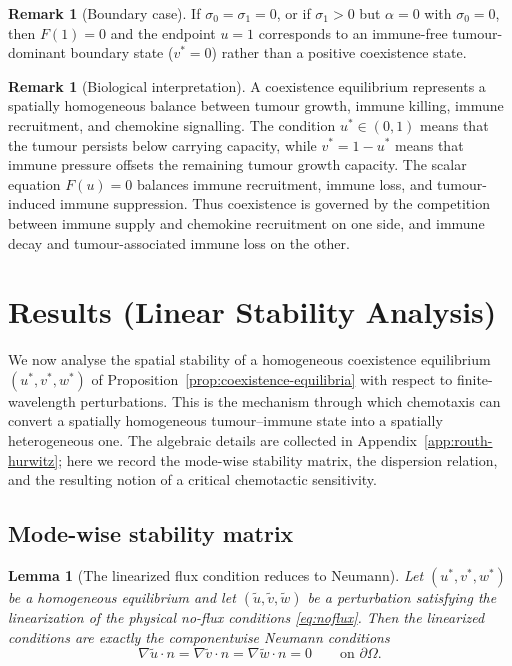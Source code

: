 \documentclass[a4paper,fleqn,longmktitle]{cas-sc}
\theoremstyle{plain}
\newtheorem{lemma}[theorem]{Lemma}
\theoremstyle{definition}
\newtheorem{remark}[theorem]{Remark}
\numberwithin{equation}{section}
\begin{document}
\begin{remark}[Boundary case]
If $\sigma_0=\sigma_1=0$, or if $\sigma_1>0$ but $\alpha=0$ with $\sigma_0=0$,
then $F(1)=0$ and the endpoint $u=1$ corresponds to an immune-free
tumour-dominant boundary state ($v^*=0$) rather than a positive coexistence
state.
\end{remark}

\begin{remark}[Biological interpretation]
A coexistence equilibrium represents a spatially homogeneous balance between
tumour growth, immune killing, immune recruitment, and chemokine signalling. The
condition $u^*\in(0,1)$ means that the tumour persists below carrying capacity,
while $v^*=1-u^*$ means that immune pressure offsets the remaining tumour growth
capacity. The scalar equation $F(u)=0$ balances immune recruitment,
immune loss, and tumour-induced immune suppression. Thus coexistence is governed
by the competition between immune supply and chemokine recruitment on one side,
and immune decay and tumour-associated immune loss on the other.
\end{remark}

\section{Results (Linear Stability Analysis)}
\label{sec:linear-stability}

We now analyse the spatial stability of a homogeneous coexistence equilibrium
$(u^*,v^*,w^*)$ of Proposition~\ref{prop:coexistence-equilibria} with respect to
finite-wavelength perturbations. This is the mechanism through which chemotaxis
can convert a spatially homogeneous tumour--immune state into a spatially
heterogeneous one. The algebraic details are collected in
Appendix~\ref{app:routh-hurwitz}; here we record the mode-wise stability matrix,
the dispersion relation, and the resulting notion of a critical chemotactic
sensitivity.

\subsection{Mode-wise stability matrix}
\label{subsec:Mk}

\begin{lemma}[The linearized flux condition reduces to Neumann]
\label{lem:bc-reduction}
Let $(u^*,v^*,w^*)$ be a homogeneous equilibrium and let
$(\widetilde u,\widetilde v,\widetilde w)$ be a perturbation satisfying the
linearization of the physical no-flux conditions \eqref{eq:noflux}. Then the
linearized conditions are exactly the componentwise Neumann conditions
\[
\nabla\widetilde u\cdot n=\nabla\widetilde v\cdot n=\nabla\widetilde w\cdot n=0
\qquad\text{on }\partial\Omega .
\]
\end{lemma}
\end{document}
